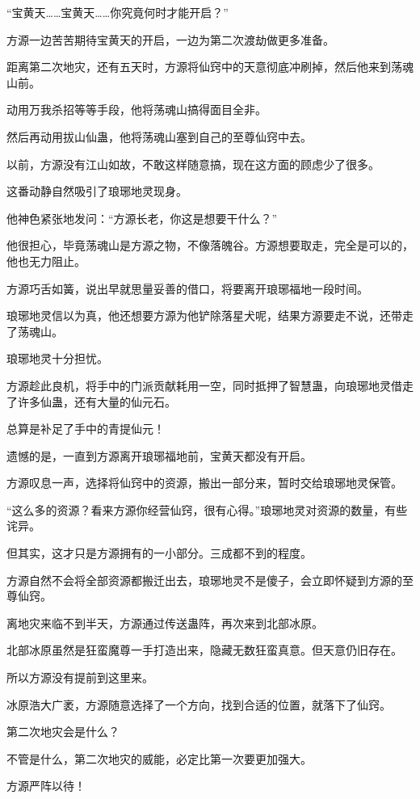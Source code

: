 \begin{this_body}
“宝黄天……宝黄天……你究竟何时才能开启？”

方源一边苦苦期待宝黄天的开启，一边为第二次渡劫做更多准备。

距离第二次地灾，还有五天时，方源将仙窍中的天意彻底冲刷掉，然后他来到荡魂山前。

动用万我杀招等等手段，他将荡魂山搞得面目全非。

然后再动用拔山仙蛊，他将荡魂山塞到自己的至尊仙窍中去。

以前，方源没有江山如故，不敢这样随意搞，现在这方面的顾虑少了很多。

这番动静自然吸引了琅琊地灵现身。

他神色紧张地发问：“方源长老，你这是想要干什么？”

他很担心，毕竟荡魂山是方源之物，不像落魄谷。方源想要取走，完全是可以的，他也无力阻止。

方源巧舌如簧，说出早就思量妥善的借口，将要离开琅琊福地一段时间。

琅琊地灵信以为真，他还想要方源为他铲除落星犬呢，结果方源要走不说，还带走了荡魂山。

琅琊地灵十分担忧。

方源趁此良机，将手中的门派贡献耗用一空，同时抵押了智慧蛊，向琅琊地灵借走了许多仙蛊，还有大量的仙元石。

总算是补足了手中的青提仙元！

遗憾的是，一直到方源离开琅琊福地前，宝黄天都没有开启。

方源叹息一声，选择将仙窍中的资源，搬出一部分来，暂时交给琅琊地灵保管。

“这么多的资源？看来方源你经营仙窍，很有心得。”琅琊地灵对资源的数量，有些诧异。

但其实，这才只是方源拥有的一小部分。三成都不到的程度。

方源自然不会将全部资源都搬迁出去，琅琊地灵不是傻子，会立即怀疑到方源的至尊仙窍。

离地灾来临不到半天，方源通过传送蛊阵，再次来到北部冰原。

北部冰原虽然是狂蛮魔尊一手打造出来，隐藏无数狂蛮真意。但天意仍旧存在。

所以方源没有提前到这里来。

冰原浩大广袤，方源随意选择了一个方向，找到合适的位置，就落下了仙窍。

第二次地灾会是什么？

不管是什么，第二次地灾的威能，必定比第一次要更加强大。

方源严阵以待！

\end{this_body}

